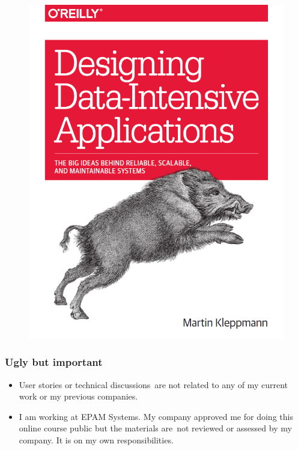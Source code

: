 \begin{frame}
\begin{figure}[ht]
\begin{minipage}[c][1\width]{
				0.3\textwidth}
			\includegraphics[width=\linewidth]{./Figures/chapter-00/ddi.png}
		\end{minipage}
		
	\end{figure}
\end{frame}





\begin{frame}
\frametitle{Ugly but important}

\begin{itemize}
	\item User stories or technical discussions are not related to any of my current work or my previous companies.
	\item I am working at EPAM Systems. My company approved me for doing this online course public but the materials are not reviewed or assessed by my company. It is on my own responsibilities.
\end{itemize}
\end{frame}

